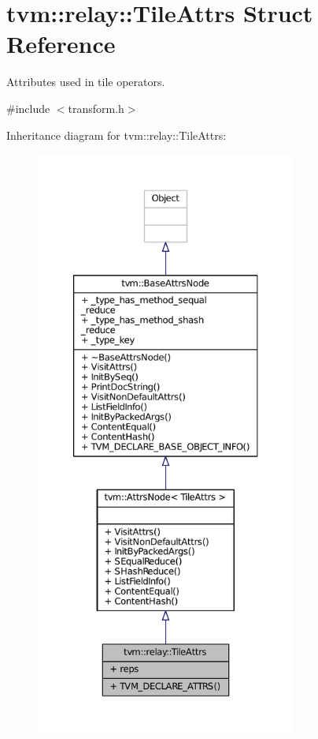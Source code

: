 \hypertarget{structtvm_1_1relay_1_1TileAttrs}{}\section{tvm\+:\+:relay\+:\+:Tile\+Attrs Struct Reference}
\label{structtvm_1_1relay_1_1TileAttrs}


Attributes used in tile operators.  




{\ttfamily \#include $<$transform.\+h$>$}



Inheritance diagram for tvm\+:\+:relay\+:\+:Tile\+Attrs\+:
\nopagebreak
\begin{figure}[H]
\begin{center}
\leavevmode
\includegraphics[height=550pt]{structtvm_1_1relay_1_1TileAttrs__inherit__graph}
\end{center}
\end{figure}


